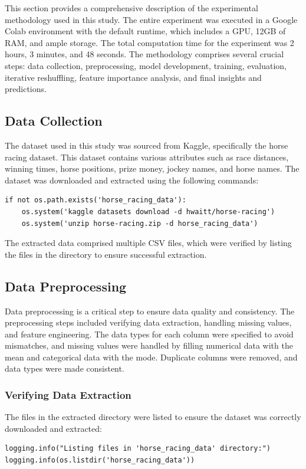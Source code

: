 \documentclass{article}
\begin{document}
This section provides a comprehensive description of the experimental methodology used in this study. The entire experiment was executed in a Google Colab environment with the default runtime, which includes a GPU, 12GB of RAM, and ample storage. The total computation time for the experiment was 2 hours, 3 minutes, and 48 seconds. The methodology comprises several crucial steps: data collection, preprocessing, model development, training, evaluation, iterative reshuffling, feature importance analysis, and final insights and predictions.

\subsection*{Data Collection}
The dataset used in this study was sourced from Kaggle, specifically the horse racing dataset. This dataset contains various attributes such as race distances, winning times, horse positions, prize money, jockey names, and horse names. The dataset was downloaded and extracted using the following commands:
\begin{verbatim}
if not os.path.exists('horse_racing_data'):
    os.system('kaggle datasets download -d hwaitt/horse-racing')
    os.system('unzip horse-racing.zip -d horse_racing_data')
\end{verbatim}
The extracted data comprised multiple CSV files, which were verified by listing the files in the directory to ensure successful extraction.

\subsection*{Data Preprocessing}
Data preprocessing is a critical step to ensure data quality and consistency. The preprocessing steps included verifying data extraction, handling missing values, and feature engineering. The data types for each column were specified to avoid mismatches, and missing values were handled by filling numerical data with the mean and categorical data with the mode. Duplicate columns were removed, and data types were made consistent.

\subsubsection*{Verifying Data Extraction}
The files in the extracted directory were listed to ensure the dataset was correctly downloaded and extracted:
\begin{verbatim}
logging.info("Listing files in 'horse_racing_data' directory:")
logging.info(os.listdir('horse_racing_data'))
\end{verbatim}
\end{document}
